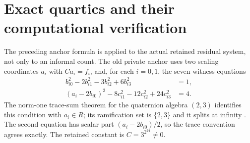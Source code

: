 \section{Exact quartics and their computational verification}
\label{sec:quartic-artifacts}

The preceding anchor formula is applied to the actual retained residual
system, not only to an informal count. The old private anchor uses two
scaling coordinates $a_i$ with $Ca_i=f_i$, and, for each $i=0,1$, the
seven-witness equations
\begin{align*}
 b_{i0}^2-2b_{i1}^2-3b_{i2}^2+6b_{i3}^2&=1,\\
 (a_i-2b_{i0})^2-8c_{i1}^2-12c_{i2}^2+24c_{i3}^2&=4.
\end{align*}
The norm-one trace-sum theorem for the quaternion algebra $(2,3)$
identifies this condition with $a_i\in R$; its ramification set is
$\{2,3\}$ and it splits at infinity
\cite[Proposition 6]{Koenigsmann2016}. The second equation has scalar
part $(a_i-2b_{i0})/2$, so the trace convention agrees exactly.
The retained constant is $C=3^{2^{24}}\ne0$.

